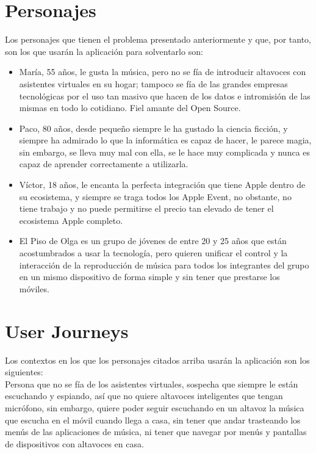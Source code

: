\section{Personajes}
Los personajes que tienen el problema presentado anteriormente y que, por tanto, son los que usarán la aplicación para solventarlo son:
\begin{itemize}
    \item María, 55 años, le gusta la música, pero no se fía de introducir altavoces con asistentes virtuales en su hogar; tampoco se fía de las grandes empresas tecnológicas por el uso tan masivo que hacen de los datos e intromisión de las mismas en todo lo cotidiano. Fiel amante del Open Source.
    \item Paco, 80 años, desde pequeño siempre le ha gustado la ciencia ficción, y siempre ha admirado lo que la informática es capaz de hacer, le parece magia, sin embargo, se lleva muy mal con ella, se le hace muy complicada y nunca es capaz de aprender correctamente a utilizarla.
    \item Víctor, 18 años, le encanta la perfecta integración que tiene Apple dentro de su ecosistema, y siempre se traga todos los Apple Event, no obstante, no tiene trabajo y no puede permitirse el precio tan elevado de tener el ecosistema Apple completo.
    \item El Piso de Olga es un grupo de jóvenes de entre 20 y 25 años que están acostumbrados a usar la tecnología, pero quieren unificar el control y la interacción de la reproducción de música para todos los integrantes del grupo en un mismo dispositivo de forma simple y sin tener que prestarse los móviles.
\end{itemize}

\section{User Journeys}
Los contextos en los que los personajes citados arriba usarán la aplicación son los siguientes:\\

Persona que no se fía de los asistentes virtuales, sospecha que siempre le están escuchando y espiando, así que no quiere altavoces inteligentes que tengan micrófono, sin embargo, quiere poder seguir escuchando en un altavoz la música que escucha en el móvil cuando llega a casa, sin tener que andar trasteando los menús de las aplicaciones de música, ni tener que navegar por menús y pantallas de dispositivos con altavoces en casa.\\

